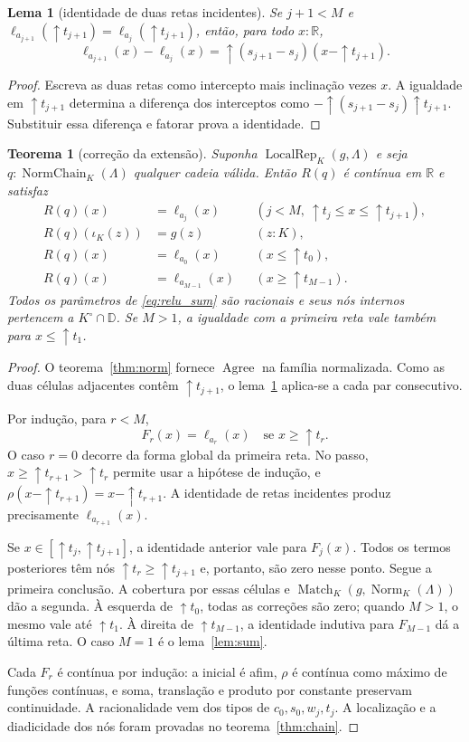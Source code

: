 \documentclass[11pt,a4paper]{article}
\newtheorem{lema}[definicao]{Lema}
\newtheorem{teorema}[definicao]{Teorema}
\newcommand{\R}{\mathbb R}
\newcommand{\D}{\mathbb D}
\newcommand{\Norm}{\operatorname{Norm}}
\newcommand{\Match}{\operatorname{Match}}
\newcommand{\Agree}{\operatorname{Agree}}
\newcommand{\Loc}{\operatorname{LocalRep}}
\begin{document}
\begin{lema}[identidade de duas retas incidentes]\label{lem:incident}
Se $j+1<M$ e
$\ell_{a_{j+1}}(\uparrow t_{j+1})=
 \ell_{a_j}(\uparrow t_{j+1})$, então, para todo $x:\R$,
\[
 \ell_{a_{j+1}}(x)-\ell_{a_j}(x)
   =\uparrow(s_{j+1}-s_j)(x-\uparrow t_{j+1}).
\]
\end{lema}
\begin{proof}
Escreva as duas retas como intercepto mais inclinação vezes $x$.
A igualdade em $\uparrow t_{j+1}$ determina a diferença dos
interceptos como $-\uparrow(s_{j+1}-s_j)\uparrow t_{j+1}$.
Substituir essa diferença e fatorar prova a identidade.
\end{proof}

\begin{teorema}[correção da extensão]\label{thm:extension}
Suponha $\Loc_K(g,\Lambda)$ e seja
$q:\operatorname{NormChain}_K(\Lambda)$ qualquer cadeia válida.
Então $R(q)$ é contínua em $\R$ e satisfaz
\begin{align*}
 R(q)(x)&=\ell_{a_j}(x)
            &&(j<M,\ \uparrow t_j\le x\le\uparrow t_{j+1}),\\
 R(q)(\iota_K(z))&=g(z)&& (z:K),\\
 R(q)(x)&=\ell_{a_0}(x)&& (x\le\uparrow t_0),\\
 R(q)(x)&=\ell_{a_{M-1}}(x)&& (x\ge\uparrow t_{M-1}).
\end{align*}
Todos os parâmetros de \eqref{eq:relu_sum} são racionais e seus
nós internos pertencem a $K^\circ\cap\D$. Se $M>1$, a igualdade
com a primeira reta vale também para $x\le\uparrow t_1$.
\end{teorema}
\begin{proof}
O teorema~\ref{thm:norm} fornece $\Agree$ na família normalizada.
Como as duas células adjacentes contêm $\uparrow t_{j+1}$,
o lema~\ref{lem:incident} aplica-se a cada par consecutivo.

Por indução, para $r<M$,
\[
 F_r(x)=\ell_{a_r}(x)\quad\text{se }x\ge\uparrow t_r.
\]
O caso $r=0$ decorre da forma global da primeira reta.
No passo, $x\ge\uparrow t_{r+1}>\uparrow t_r$ permite usar a
hipótese de indução, e
$\rho(x-\uparrow t_{r+1})=x-\uparrow t_{r+1}$. A identidade
de retas incidentes produz precisamente $\ell_{a_{r+1}}(x)$.

Se $x\in[\uparrow t_j,\uparrow t_{j+1}]$, a identidade anterior
vale para $F_j(x)$. Todos os termos posteriores têm nós
$\uparrow t_r\ge\uparrow t_{j+1}$ e, portanto, são zero nesse
ponto. Segue a primeira conclusão. A cobertura por essas células
e $\Match_K(g,\Norm_K(\Lambda))$ dão a segunda.
À esquerda de $\uparrow t_0$, todas as correções são zero; quando
$M>1$, o mesmo vale até $\uparrow t_1$. À direita de
$\uparrow t_{M-1}$, a identidade indutiva para $F_{M-1}$ dá a
última reta. O caso $M=1$ é o lema~\ref{lem:sum}.

Cada $F_r$ é contínua por indução: a inicial é afim, $\rho$ é
contínua como máximo de funções contínuas, e soma, translação e
produto por constante preservam continuidade. A racionalidade
vem dos tipos de $c_0,s_0,w_j,t_j$. A localização e a diadicidade
dos nós foram provadas no teorema~\ref{thm:chain}.
\end{proof}
\end{document}
